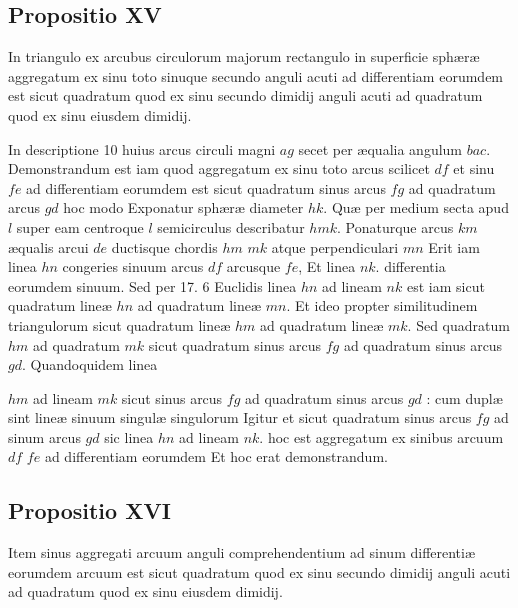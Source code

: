 \documentclass[11pt,a4paper]{article}
\begin{document}
\subsection*{Propositio XV}

In triangulo ex arcubus circulorum majorum rectangulo in superficie sphæræ aggregatum ex sinu toto sinuque secundo anguli acuti ad differentiam eorumdem est sicut quadratum quod ex sinu secundo dimidij anguli acuti ad quadratum quod ex sinu eiusdem dimidij.

In descriptione 10 huius arcus circuli magni $ag$ secet per æqualia angulum $bac$. Demonstrandum est iam quod aggregatum ex sinu toto arcus scilicet $df$ et sinu $fe$ ad differentiam eorumdem est sicut quadratum sinus arcus $fg$ ad quadratum arcus $gd$ hoc modo Exponatur sphæræ diameter $hk$. Quæ per medium secta apud $l$ super eam centroque $l$ semicirculus describatur $hmk$. Ponaturque arcus $km$ æqualis arcui $de$ ductisque chordis $hm$ $mk$ atque perpendiculari $mn$ Erit iam linea $hn$ congeries sinuum arcus $df$ arcusque $fe$, Et linea $nk$. differentia eorumdem sinuum. Sed per 17. 6 Euclidis linea $hn$ ad lineam $nk$ est iam sicut quadratum lineæ $hn$ ad quadratum lineæ $mn$. Et ideo propter similitudinem triangulorum sicut quadratum lineæ $hm$ ad quadratum lineæ $mk$. Sed quadratum $hm$ ad quadratum $mk$ sicut quadratum sinus arcus $fg$ ad quadratum sinus arcus $gd$. Quandoquidem linea

$hm$ ad lineam $mk$ sicut sinus arcus $fg$ ad quadratum sinus arcus $gd$ : cum duplæ sint lineæ sinuum singulæ singulorum Igitur et sicut quadratum sinus arcus $fg$ ad sinum arcus $gd$ sic linea $hn$ ad lineam $nk$. hoc est aggregatum ex sinibus arcuum $df$ $fe$ ad differentiam eorumdem Et hoc erat demonstrandum.

\subsection*{Propositio XVI}

Item sinus aggregati arcuum anguli comprehendentium ad sinum differentiæ eorumdem arcuum est sicut quadratum quod ex sinu secundo dimidij anguli acuti ad quadratum quod ex sinu eiusdem dimidij.
\end{document}
